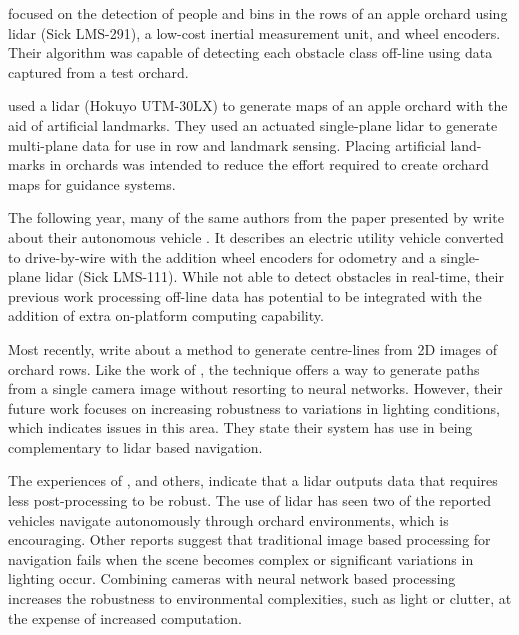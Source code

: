 \documentclass[preprint,authoryear,12pt]{elsarticle}
\begin{document}
        \cite{Freitas2012} focused on the detection of people and bins in the rows of an apple orchard using lidar (Sick LMS-291), a low-cost inertial measurement unit, and wheel encoders.
        Their algorithm was capable of detecting each obstacle class off-line using data captured from a test orchard.

        \cite{Zhang2014} used a lidar (Hokuyo UTM-30LX) to generate maps of an apple orchard with the aid of artificial landmarks.
        They used an actuated single-plane lidar to generate multi-plane data for use in row and landmark sensing.
        Placing artificial land-marks in orchards was intended to reduce the effort required to create orchard maps for guidance systems.

        The following year, many of the same authors from  the paper presented by \cite{Zhang2014} write about their autonomous vehicle \citep{Bergerman2015}.
        It describes an electric utility vehicle converted to drive-by-wire with the addition wheel encoders for odometry and a single-plane lidar (Sick LMS-111).
        While not able to detect obstacles in real-time, their previous work processing off-line data \citep{Freitas2012} has potential to be integrated with the addition of extra on-platform computing capability.

        Most recently, \cite{Sharifi2015} write about a method to generate centre-lines from 2D images of orchard rows.
        Like the work of \cite{He2011}, the technique offers a way to generate paths from a single camera image without resorting to neural networks.
        However, their future work focuses on increasing robustness to variations in lighting conditions, which indicates issues in this area.
        They state their system has use in being complementary to lidar based navigation.

        The experiences of \cite{Scarfe2012}, and others, indicate that a lidar outputs data that requires less post-processing to be robust.
        The use of lidar has seen two of the reported vehicles navigate autonomously through orchard environments, which is encouraging.
        Other reports suggest that traditional image based processing for navigation fails when the scene becomes complex or significant variations in lighting occur.
        Combining cameras with neural network based processing increases the robustness to environmental complexities, such as light or clutter, at the expense of increased computation.
\end{document}
